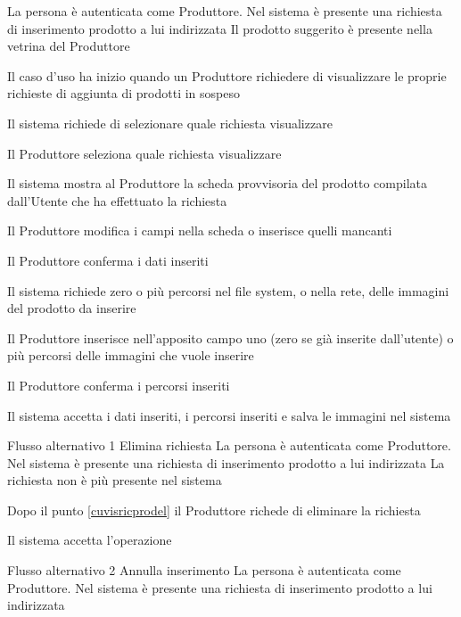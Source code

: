 {}
{La persona è autenticata come Produttore. Nel sistema è presente una richiesta di inserimento prodotto a lui indirizzata}
{Il prodotto suggerito è presente nella vetrina del Produttore}
{\begin{enumCU}
		\item Il caso d'uso ha inizio quando un Produttore richiedere di visualizzare le proprie richieste di aggiunta di prodotti in sospeso
		\item Il sistema richiede di selezionare quale richiesta visualizzare
		\item Il Produttore seleziona quale richiesta visualizzare
		\item Il sistema mostra al Produttore la scheda provvisoria del prodotto compilata dall'Utente che ha effettuato la richiesta \label{cuvisricprodel}
		\item Il Produttore modifica i campi nella scheda o inserisce quelli mancanti \label{cuvisricpro:1}
		\item Il Produttore conferma i dati inseriti
		\item Il sistema richiede zero o più percorsi nel file system, o nella rete, delle immagini del prodotto da inserire
		\item Il Produttore inserisce nell'apposito campo uno (zero se già inserite dall'utente) o più percorsi delle immagini che vuole inserire \label{cuvisricpro:2}
		\item Il Produttore conferma i percorsi inseriti \label{cuvisricpro:3}
		\item Il sistema accetta i dati inseriti, i percorsi inseriti e salva le immagini nel sistema
	\end{enumCU}}
%
{Flusso alternativo 1}%
{Elimina richiesta}%
{La persona è autenticata come Produttore. Nel sistema è presente una richiesta di inserimento prodotto a lui indirizzata}
{La richiesta non è più presente nel sistema}%
{\begin{enumCU}
		\item Dopo il punto \ref{cuvisricprodel} il Produttore richede di eliminare la richiesta
		\item Il sistema accetta l'operazione
	\end{enumCU}}%
%
{Flusso alternativo 2}%
{Annulla inserimento}%
{La persona è autenticata come Produttore. Nel sistema è presente una richiesta di inserimento prodotto a lui indirizzata}
{\postNulle}%
